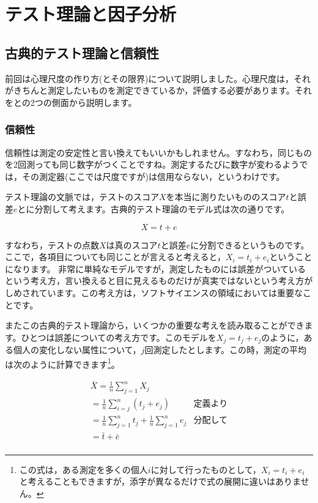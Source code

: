 \documentclass{ltjsbook}
\begin{document}
\chapter{テスト理論と因子分析}
\label{x03_testTheory}

\section{古典的テスト理論と信頼性}

前回は心理尺度の作り方(とその限界)について説明しました。心理尺度は，それがきちんと測定したいものを測定できているか，評価する必要があります。それをとの2つの側面から説明します。

\subsection{信頼性}
信頼性は測定の安定性と言い換えてもいいかもしれません。すなわち，同じものを2回測っても同じ数字がつくことですね。測定するたびに数字が変わるようでは，その測定器(ここでは尺度ですが)は信用ならない，というわけです。

テスト理論の文脈では，テストのスコア$X$を本当に測りたいもののスコア$t$と誤差$e$とに分割して考えます。古典的テスト理論のモデル式は次の通りです。

\[ X = t + e \]

すなわち，テストの点数$X$は真のスコア$t$と誤差$e$に分割できるというものです。ここで，各項目についても同じことが言えると考えると，$X_i = t_i + e_i$ということになります。
非常に単純なモデルですが，測定したものには誤差がついているという考え方，言い換えると目に見えるものだけが真実ではないという考え方がしめされています。この考え方は，ソフトサイエンスの領域においては重要なことです。

またこの古典的テスト理論から，いくつかの重要な考えを読み取ることができます。ひとつは誤差についての考え方です。このモデルを$X_j = t_j + e_j$のように，ある個人の変化しない属性について，$j$回測定したとします。この時，測定の平均は次のように計算できます\footnote{この式は，ある測定を多くの個人$i$に対して行ったものとして，$X_i = t_i + e_i$と考えることもできますが，添字が異なるだけで式の展開に違いはありません。}。

\begin{align*}
	 & \bar{X}  =  \frac{1}{n}\sum_{j=1}^n X_j                           &             & \mbox{} \\
	 & =  \frac{1}{n}\sum_{i=j}^n (t_j + e_j)                            & \mbox{定義より}           \\
	 & =  \frac{1}{n} \sum_{j=1}^n  t_j +  \frac{1}{n} \sum_{j=1}^n  e_j & \mbox{分配して}           \\
	 & =  \bar{t} + \bar{e}                                              & \mbox{}               \\
\end{align*}
\end{document}

